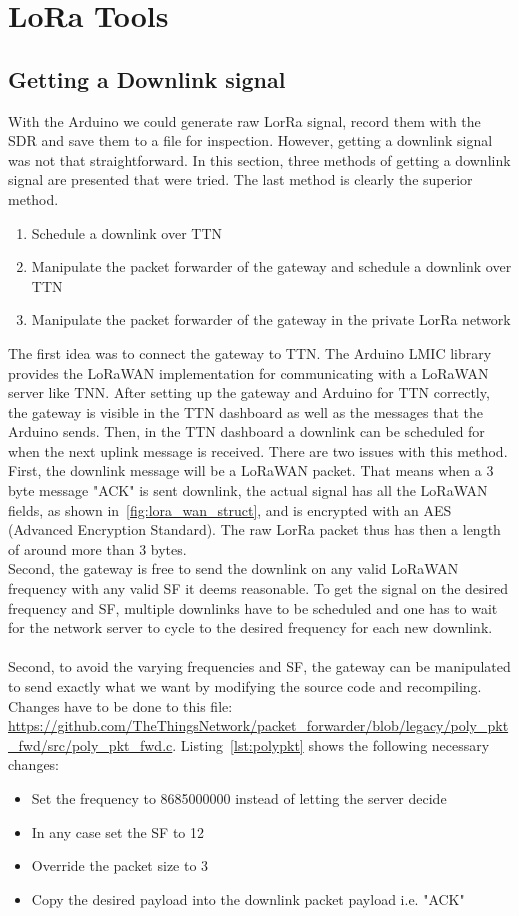 \chapter{LoRa Tools}
\label{chap:lora_tools}
\section{Getting a Downlink signal}
With the Arduino we could generate raw LorRa signal, record them with the SDR and save them to a file for inspection.
However, getting a downlink signal was not that straightforward. 
In this section, three methods of getting a downlink signal are presented that were tried.
The last method is clearly the superior method.

\begin{enumerate}
    \item Schedule a downlink over TTN
    \item Manipulate the packet forwarder of the gateway and schedule a downlink over TTN
    \item Manipulate the packet forwarder of the gateway in the private LorRa network
\end{enumerate}

The first idea was to connect the gateway to TTN. 
The Arduino LMIC library provides the LoRaWAN implementation for communicating with a LoRaWAN server like TNN.
After setting up the gateway and Arduino for TTN correctly, the gateway is visible in the TTN dashboard as well as 
the messages that the Arduino sends. Then, in the TTN dashboard a downlink can be scheduled for when the next uplink message 
is received. There are two issues with this method. First, the downlink message will be a LoRaWAN packet. That means when a 3 byte message "ACK"
is sent downlink, the actual signal has all the LoRaWAN fields, as shown in~\ref{fig:lora_wan_struct}, and is encrypted with an AES (Advanced Encryption Standard).
The raw LorRa packet thus has then a length of around more than 3 bytes.\\
Second, the gateway is free to send the downlink on any valid LoRaWAN frequency with any valid SF it deems reasonable. To get the signal on the desired frequency and SF, 
multiple downlinks have to be scheduled and one has to wait for the network server to cycle to the desired frequency for each new downlink. 
\\
\\
Second, to avoid the varying frequencies and SF, the gateway can be manipulated to send exactly what we want by modifying the source code 
and recompiling.
Changes have to be done to this file: \url{https://github.com/TheThingsNetwork/packet_forwarder/blob/legacy/poly_pkt_fwd/src/poly_pkt_fwd.c}.
Listing~\ref{lst:polypkt} shows the following necessary changes:
\begin{itemize}
    \item Set the frequency to 8685000000 instead of letting the server decide
    \item In any case set the SF to 12
    \item Override the packet size to 3
    \item Copy the desired payload into the downlink packet payload i.e. "ACK"
\end{itemize}

